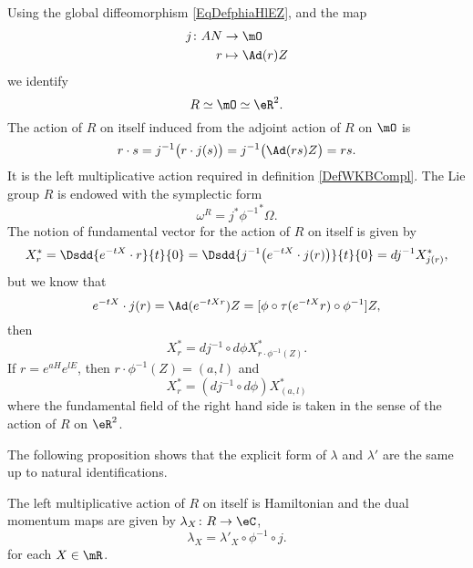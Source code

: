 Using the global diffeomorphism \eqref{EqDefphiaHlEZ}, and the map 
\begin{equation}
\begin{aligned}
 j\colon AN&\to \mO \\ 
r&\mapsto \Ad(r)Z 
\end{aligned}
\end{equation}
we identify
\[
   R\simeq\mO\simeq\eR^2.
\]
The action of $R$ on itself induced from the adjoint action of $R$ on $\mO$ is 
\[ 
  r\cdot s=j^{-1}\big( r\cdot j(s) \big)=j^{-1}\big( \Ad(rs)Z \big)=rs.
\]
It is the left multiplicative action required in definition \ref{DefWKBCompl}. The Lie group $R$ is endowed with the symplectic form 
\[ 
\omega^R=j^*{\phi^{-1}}^*\Omega.
\]
The notion of fundamental vector for the action of $R$ on itself is given by
\begin{equation}
  X^*_r=\Dsdd{e^{-tX}\cdot r}{t}{0} 
        =\Dsdd{ j^{-1}\big( e^{-tX}\cdot j(r) \big) }{t}{0}
        =dj^{-1} X^*_{j(r)},
\end{equation}
but we know that 
\[ 
  e^{-tX}\cdot j(r)=\Ad(e^{-tX r})Z=[\phi\circ \tau(e^{-tX}r)\circ \phi^{-1}]Z,
\]
 then
\[
X^*_r=dj^{-1}\circ d\phi X^*_{r\cdot \phi^{-1}(Z)}.
\]
If $r=e^{aH}e^{lE}$, then $r\cdot \phi^{-1}(Z)=(a,l)$ and
\begin{equation}
   X^*_r=(dj^{-1}\circ d\phi) X^*_{(a,l)}
\end{equation}
where the fundamental field of the right hand side is taken in the sense of the action of $R$ on $\eR^2$. 

The following proposition shows that the explicit form of $\lambda$ and $\lambda'$ are the same up to natural identifications.

\begin{proposition}  
The left multiplicative action of $R$ on itself is Hamiltonian and the dual momentum maps are given by  $\lambda_X\colon R\to \eC$,
\begin{equation}
\lambda_X= \lambda'_X\circ\phi^{-1}\circ j.
\end{equation}
for each $X\in\mR$.
\label{PropMomslR}
\end{proposition}

